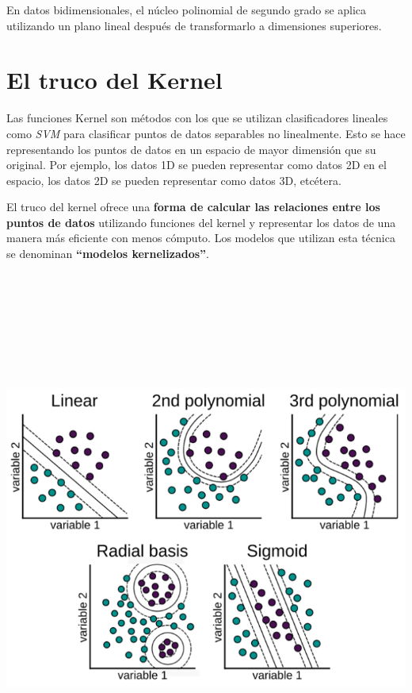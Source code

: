 \documentclass[
]{book}
\begin{document}
En datos bidimensionales, el núcleo polinomial de segundo grado se aplica utilizando un plano lineal después de transformarlo a dimensiones superiores.

\hypertarget{el-truco-del-kernel}{%
\section{El truco del Kernel}\label{el-truco-del-kernel}}

Las funciones Kernel son métodos con los que se utilizan clasificadores lineales como \emph{SVM} para clasificar puntos de datos separables no linealmente. Esto se hace representando los puntos de datos en un espacio de mayor dimensión que su original. Por ejemplo, los datos 1D se pueden representar como datos 2D en el espacio, los datos 2D se pueden representar como datos 3D, etcétera.

El truco del kernel ofrece una \textbf{forma de calcular las relaciones entre los puntos de datos} utilizando funciones del kernel y representar los datos de una manera más eficiente con menos cómputo. Los modelos que utilizan esta técnica se denominan \textbf{``modelos kernelizados''}.

\begin{center}\includegraphics[width=700pt,height=500pt]{img/02-svm/06_kernels} \end{center}
\end{document}
